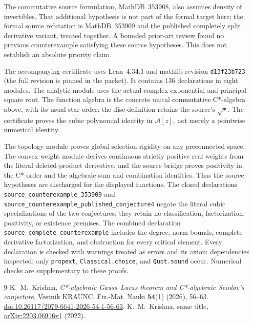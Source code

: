 \documentclass[11pt]{article}
\newcommand{\A}{\mathcal A}
\begin{document}
The commutative source formulation, MathDB~353908, also assumes density of
invertibles. That additional hypothesis is not part of the formal target
here; the formal source refutation is MathDB~353909 and the published
completely split derivative variant, treated together. A bounded prior-art
review found no previous counterexample satisfying these source hypotheses.
This does not establish an absolute priority claim.

The accompanying certificate uses Lean~4.34.1 and mathlib revision
\texttt{d13f23b723} (the full revision is pinned in the packet). It contains
136 declarations in eight modules. The analytic module uses the actual complex
exponential and principal square root. The function algebra is the concrete
unital commutative C*-algebra above, with its usual star order; the disc
definition retains the source's $\sqrt r$. The certificate proves the cubic
polynomial identity in $\A[z]$, not merely a pointwise numerical identity.

The topology module proves global selection rigidity on any preconnected
space. The convex-weight module derives continuous strictly positive real
weights from the literal deleted-product derivative, and the source bridge
proves positivity in the C*-order and the algebraic sum and combination
identities. Thus the source hypotheses are discharged for the displayed
functions. The closed declarations
\texttt{source\_counterexample\_353909} and
\texttt{source\_counterexample\_published\_conjecture4} negate the literal
cubic specializations of the two conjectures; they retain no classification,
factorization, positivity, or existence premises. The combined declaration
\texttt{source\_complete\_counterexample} includes the degree, norm bounds,
complete derivative factorization, and obstruction for every critical element.
Every declaration is checked with warnings treated as errors and its axiom
dependencies inspected; only \texttt{propext}, \texttt{Classical.choice}, and
\texttt{Quot.sound} occur. Numerical checks are supplementary to these proofs.

\begin{thebibliography}{9}
 K.~M.~Krishna,
\emph{C*-algebraic Gauss--Lucas theorem and C*-algebraic Sendov's conjecture},
Vestnik KRAUNC. Fiz.-Mat. Nauki \textbf{54}(1) (2026), 56--63.
\href{https://doi.org/10.26117/2079-6641-2026-54-1-56-63}{doi:10.26117/2079-6641-2026-54-1-56-63}.
 K.~M.~Krishna, same title,
\href{https://arxiv.org/abs/2203.06916v1}{arXiv:2203.06916v1} (2022).
\end{thebibliography}
\end{document}
